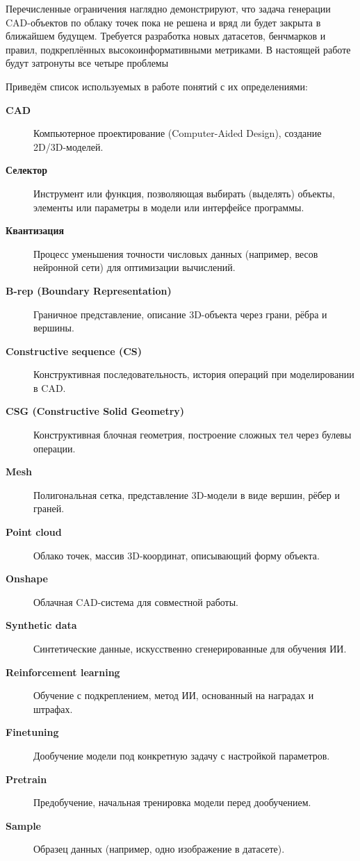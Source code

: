 Перечисленные ограничения наглядно демонстрируют, что задача генерации CAD-объектов по облаку точек пока не решена и вряд ли будет закрыта в ближайшем будущем.
Требуется разработка новых датасетов, бенчмарков и правил, подкреплённых высокоинформативными метриками.
В настоящей работе будут затронуты все четыре проблемы

Приведём список используемых в работе понятий с их определениями:
\begin{description}
	\item[\textbf{CAD}] %
	      Компьютерное проектирование (Computer-Aided Design), создание 2D/3D-моделей.
	\item[\textbf{Селектор}] %
	      Инструмент или функция, позволяющая выбирать (выделять) объекты, элементы или параметры в модели или интерфейсе программы.
	\item[\textbf{Квантизация}] %
	      Процесс уменьшения точности числовых данных (например, весов нейронной сети) для оптимизации вычислений.
	\item[\textbf{B-rep (Boundary Representation)}] %
	      Граничное представление, описание 3D-объекта через грани, рёбра и вершины.
	\item[\textbf{Constructive sequence (CS)}] %
	      Конструктивная последовательность, история операций при моделировании в CAD.
	\item[\textbf{CSG (Constructive Solid Geometry)}] %
	      Конструктивная блочная геометрия, построение сложных тел через булевы операции.
	\item[\textbf{Mesh}] %
	      Полигональная сетка, представление 3D-модели в виде вершин, рёбер и граней.
	\item[\textbf{Point cloud}] %
	      Облако точек, массив 3D-координат, описывающий форму объекта.
	\item[\textbf{Onshape}] %
	      Облачная CAD-система для совместной работы.
	\item[\textbf{Synthetic data}] %
	      Синтетические данные, искусственно сгенерированные для обучения ИИ.
	\item[\textbf{Reinforcement learning}] %
	      Обучение с подкреплением, метод ИИ, основанный на наградах и штрафах.
	\item[\textbf{Finetuning}] %
	      Дообучение модели под конкретную задачу с настройкой параметров.
	\item[\textbf{Pretrain}] %
	      Предобучение, начальная тренировка модели перед дообучением.
	\item[\textbf{Sample}] %
	      Образец данных (например, одно изображение в датасете).

\end{description}
